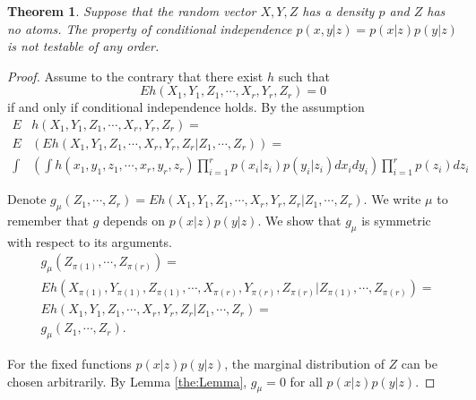 \documentclass{article}
\newtheorem{Theorem}{Theorem}
\begin{document}
\begin{Theorem}
\label{th:1}
 Suppose that the random vector $X,Y,Z$ has a density $p$ and $Z$ has no atoms. The property of conditional independence $p(x,y|z) = p(x|z)p(y|z)$ is not testable of any order. 
\end{Theorem}

\begin{proof}
Assume to the contrary that there exist $h$ such that 
$$
E h(X_1,Y_1,Z_1, \cdots, X_r,Y_r,Z_r) =0 $$ 
if and only if conditional independence holds. By the assumption  
\begin{align}
 E& h(X_1,Y_1,Z_1, \cdots, X_r,Y_r,Z_r) = \\
 E& \left( E h(X_1,Y_1,Z_1, \cdots, X_r,Y_r,Z_r | Z_1,\cdots,Z_r) \right) = \\
 \int& \left(\int h(x_1,y_1,z_1,\cdots, x_r,y_r,z_r) \prod_{i=1}^r p(x_i|z_i)p(y_i|z_i) dx_i dy_i  \right)  \prod_{i=1}^r p(z_i)dz_i
\end{align}

Denote $g_{\mu}( Z_1,\cdots,Z_r) = E h(X_1,Y_1,Z_1, \cdots, X_r,Y_r,Z_r | Z_1,\cdots,Z_r)$. We write $\mu$ to remember that $g$ depends on $p(x|z)p(y|z)$. We show that $g_{\mu}$ is symmetric with respect to its arguments. 
\begin{align}
&g_{\mu}(Z_{\pi(1)}, \cdots,Z_{\pi(r)} )  = \\ 
&E h(X_{\pi(1)},Y_{\pi(1)},Z_{\pi(1)}, \cdots, X_{\pi(r)},Y_{\pi(r)},Z_{\pi(r)} | Z_{\pi(1)},\cdots,Z_{\pi(r)}) = \\
&E h(X_1,Y_1,Z_1, \cdots, X_r,Y_r,Z_r | Z_1,\cdots,Z_r) = \\
&g_{\mu}(Z_1, \cdots,Z_r ). 
\end{align}

For the fixed functions $p(x|z)p(y|z)$, the marginal distribution of $Z$ can be chosen  arbitrarily.   By Lemma \ref{the:Lemma}, $g_{\mu}=0$ for all $p(x|z)p(y|z)$.  


\end{proof}
\end{document}
